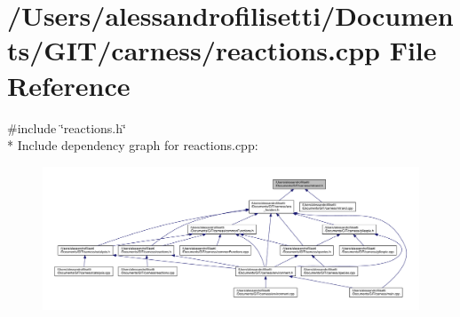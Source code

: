 \hypertarget{a00075}{\section{/\-Users/alessandrofilisetti/\-Documents/\-G\-I\-T/carness/reactions.cpp File Reference}
\label{a00075}
}
{\ttfamily \#include \char`\"{}reactions.\-h\char`\"{}}\\*
Include dependency graph for reactions.\-cpp\-:
\nopagebreak
\begin{figure}[H]
\begin{center}
\leavevmode
\includegraphics[width=350pt]{a00195}
\end{center}
\end{figure}
